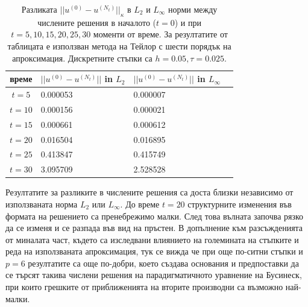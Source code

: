 \documentclass[a4paper]{article}
\theoremstyle{remark}
\begin{document}
\begin{table}[ht]
\centering
\small
		\begin{tabular}{||c|l|l|l||}
			\hline
			\hline
  време   &  $||u^{(0)} - u^{(N_t)}||$ in $L_2$  & $||u^{(0)} - u^{(N_t)}||$ in $L_\infty$   \\
   		      \hline 
			\hline
  $t=5$     & 0.000053 & 0.000007      \\
			\hline 
  $t=10$   & 0.000156 & 0.000021      \\
			\hline 
  $t=15$   & 0.000661 & 0.000612      \\
	   \hline
  $t=20$   & 0.016504 & 0.016895      \\
			\hline
  $t=25$   & 0.413847 & 0.415749      \\
    \hline
  $t=30$   & 3.095709 & 2.528528       \\
	   \hline
		\hline 
		\end{tabular}
		\caption{Разликата $||u^{(0)} - u^{(N_t)}||_\kappa$ в $L_2$ и $L_\infty$ норми между числените решения в началото ($t=0$) и при $t=5, 10, 15, 20, 25, 30$ моменти от време. За резултатите от таблицата е използван метода на Тейлор с шести порядък на апроксимация. Дискретните стъпки са $h=0.05, \tau = 0.025$. }
\label{tableJ}
\end{table}
\FloatBarrier
Резултатите за разликите в числените решения са доста близки независимо от използваната норма $L_2$ или $L_\infty$. До време $t=20$ структурните изменения във формата на решението са пренебрежимо малки. След това вълната започва рязко да се изменя и се разпада във вид на пръстен. В допълнение към разсъжденията от миналата част, където са изследвани влиянието на големината на стъпките и реда на използваната апроксимация, тук се вижда че при още по-ситни стъпки и $p=6$ резултатите са още по-добри, което създава основания и предпоставки да се търсят такива числени решения на парадигматичното уравнение на Бусинеск, при които грешките от приближенията на вторите производни са възможно най-малки.
\end{document}

